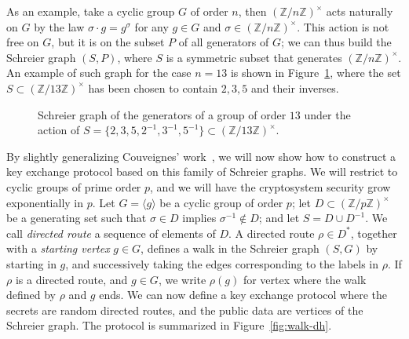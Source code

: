 \documentclass[10pt]{article}
\theoremstyle{plain}
\theoremstyle{definition}
\begin{document}
As an example, take a cyclic group $G$ of order $n$, then $(ℤ/nℤ)^{×}$
acts naturally on $G$ by the law $σ·g=g^σ$ for any $g∈G$ and
$σ∈(ℤ/nℤ)^{×}$. %
This action is not free on $G$, but it is on the subset $P$ of all
generators of $G$; we can thus build the Schreier graph $(S,P)$, where
$S$ is a symmetric subset that generates $(ℤ/nℤ)^{×}$. %
An example of such graph for the case $n=13$ is shown in
Figure~\ref{fig:schreier}, where the set $S⊂(ℤ/13ℤ)^{×}$ has been
chosen to contain $2,3,5$ and their inverses.

\begin{figure}
  \centering
  \caption{Schreier graph of the generators of a group of order $13$
    under the action of
    $S=\{2,3,5,2^{-1},3^{-1},5^{-1}\}⊂(ℤ/13ℤ)^{×}$.}
  \label{fig:schreier}
\end{figure}

By slightly generalizing Couveignes' work~\cite{Couv}, we will now
show how to construct a key exchange protocol based on this family of
Schreier graphs. %
We will restrict to cyclic groups of prime order $p$, and we will have
the cryptosystem security grow exponentially in $p$. %
Let $G=〈g〉$ be a cyclic group of order $p$; let $D⊂(ℤ/pℤ)^{×}$ be a
generating set such that $σ∈D$ implies $σ^{-1}∉D$; and let
$S = D∪D^{-1}$. %
We call \emph{directed route} a sequence of elements of $D$. %
A directed route $ρ∈D^*$, together with a \emph{starting vertex}
$g∈G$, defines a walk in the Schreier graph $(S,G)$ by starting in
$g$, and successively taking the edges corresponding to the labels in
$ρ$. %
If $ρ$ is a directed route, and $g∈G$, we write $ρ(g)$ for vertex
where the walk defined by $ρ$ and $g$ ends. %
We can now define a key exchange protocol where the secrets are random
directed routes, and the public data are vertices of the Schreier
graph. %
The protocol is summarized in Figure~\ref{fig:walk-dh}.
\end{document}
